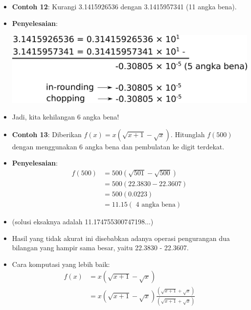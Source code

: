 \documentclass[pdflatex,compress]{beamer}
\begin{document}
\begin{frame}
	\begin{itemize}
		\item \textbf{Contoh 12}: Kurangi 3.1415926536 dengan
		3.1415957341 (11 angka bena).
		\item[] \textbf{Penyelesaian}:
		\begin{center}
			\includegraphics[width=0.8\linewidth]{img/img106.png}
		\end{center}
		\item[] Jadi, kita kehilangan 6 angka bena!	
	\end{itemize}
\end{frame}

\begin{frame}
	\begin{itemize}
		\item \textbf{Contoh 13}: Diberikan $ f(x) = x(\sqrt{x+1}-\sqrt{x}). $ Hitunglah $ f(500) $ dengan menggunakan 6 angka bena dan pembulatan ke digit terdekat.
		\item[] \textbf{Penyelesaian}:
		\begin{align*}
		f(500) &= 500(\sqrt{501}-\sqrt{500}) \\
		&= 500(22.3830- 22.3607) \\
		&= 500(0.0223) \\
		&= 11.15 (\text{ 4 angka bena})
		\end{align*}
		\item[] (solusi eksaknya adalah 11.174755300747198$\dots$)
		\item[] Hasil yang tidak akurat ini disebabkan adanya operasi pengurangan dua bilangan yang hampir sama besar, yaitu 22.3830 - 22.3607.
	\end{itemize}
\end{frame}

\begin{frame}
	\begin{itemize}
		\item Cara komputasi yang lebih baik:
		\begin{align*}
		f(x) &= x( \sqrt{x+1} - \sqrt{x}) \\
			 &= x( \sqrt{x+1} - \sqrt{x}) \frac{( \sqrt{x+1} + \sqrt{x})}{( \sqrt{x+1} + \sqrt{x})} \\
		\end{align*}
	\end{itemize}
\end{frame}
\end{document}
